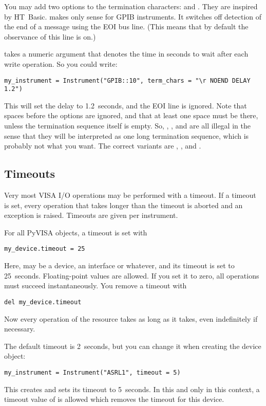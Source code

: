 \documentclass{howto}
\begin{document}
You may add two options to the termination characters:  and
.  They are inspired by HT~Basic.   makes only sense
for GPIB instruments.  It switches off detection of the end of a message using
the EOI bus line.  (This means that by default the observance of this line is
on.)

 takes a numeric argument that denotes the time in seconds to wait
after each write operation.  So you could write:
\begin{verbatim}
my_instrument = Instrument("GPIB::10", term_chars = "\r NOEND DELAY 1.2")
\end{verbatim}
This will set the delay to 1.2~seconds, and the EOI line is ignored.  Note that
spaces before the options are ignored, and that at least one space must be
there, unless the termination sequence itself is empty.  So, , , and  are all illegal in the sense
that they will be interpreted as one long termination sequence, which is
probably not what you want.  The correct variants are ,
, and .

\subsection{Timeouts}
\label{sec:timeouts}

Very most VISA I/O operations may be performed with a timeout.  If a timeout is
set, every operation that takes longer than the timeout is aborted and an
exception is raised.  Timeouts are given per instrument.

For all PyVISA objects, a timeout is set with
\begin{verbatim}
my_device.timeout = 25
\end{verbatim}
Here,  may be a device, an interface or whatever, and its
timeout is set to 25~seconds.  Floating-point values are allowed.  If you set
it to zero, all operations must succeed instantaneously.  You remove a timeout
with
\begin{verbatim}
del my_device.timeout
\end{verbatim}
Now every operation of the resource takes as long as it takes, even
indefinitely if necessary.

The default timeout is 2~seconds, but you can change it when creating the
device object:
\begin{verbatim}
my_instrument = Instrument("ASRL1", timeout = 5)
\end{verbatim}
This creates  and sets its timeout to 5~seconds.  In this
and only in this context, a timeout value of  is allowed which
removes the timeout for this device.
\end{document}

